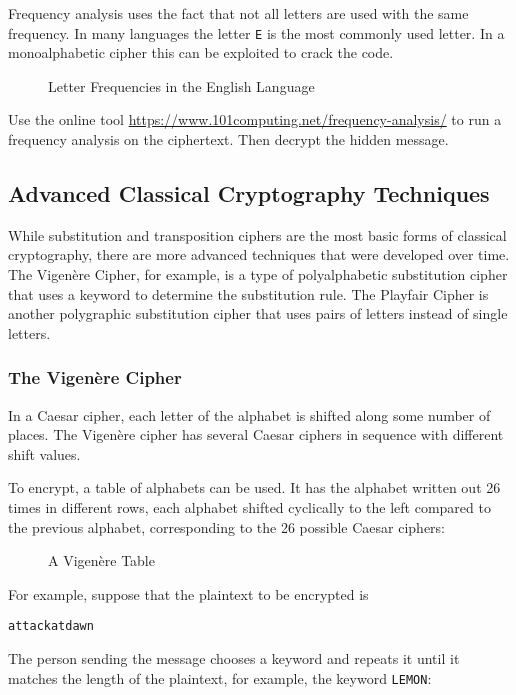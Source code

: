 \documentclass[11pt,a4paper]{report}
\begin{document}
Frequency analysis uses the fact that not all letters are used with the same frequency. In many languages the letter \verb|E| is the most commonly used letter. In a monoalphabetic cipher this can be exploited to crack the code. 
\begin{figure}[h]
\caption{Letter Frequencies in the English Language}
\end{figure}

\begin{ex}
Use the online tool \url{https://www.101computing.net/frequency-analysis/} to run a frequency analysis on the ciphertext. Then decrypt the hidden message.
\end{ex}


\subsection{Advanced Classical Cryptography Techniques}

While substitution and transposition ciphers are the most basic forms of classical cryptography, there are more advanced techniques that were developed over time. The Vigenère Cipher, for example, is a type of polyalphabetic substitution cipher that uses a keyword to determine the substitution rule. The Playfair Cipher is another polygraphic substitution cipher that uses pairs of letters instead of single letters. 

\subsubsection{The Vigenère Cipher}

In a Caesar cipher, each letter of the alphabet is shifted along some number of places.  The Vigenère cipher has several Caesar ciphers in sequence with different shift values.

To encrypt, a table of alphabets can be used. It has the alphabet written out 26 times in different rows, each alphabet shifted cyclically to the left compared to the previous alphabet, corresponding to the 26 possible Caesar ciphers:
\begin{figure}[h]
\caption{A Vigenère Table}
\end{figure}

For example, suppose that the plaintext to be encrypted is

\verb|attackatdawn|

The person sending the message chooses a keyword and repeats it until it matches the length of the plaintext, for example, the keyword \verb|LEMON|:
\end{document}
